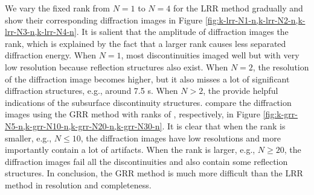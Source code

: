 We vary the fixed rank from $N=1$ to $N=4$ for the LRR method gradually and show their corresponding diffraction images in Figure \ref{fig:k-lrr-N1-n,k-lrr-N2-n,k-lrr-N3-n,k-lrr-N4-n}. It is salient that the amplitude of diffraction images  the rank, which is explained by the fact that a larger rank causes less separated diffraction energy. When $N=1$, most discontinuities  imaged well but with very low resolution because  reflection structures also exist. When $N=2$, the resolution of the diffraction image becomes higher, but it also misses a lot of significant diffraction structures, e.g., around 7.5 s. When $N>2$, the  provide helpful indications of the subsurface discontinuity structures.  compare the diffraction images using the GRR method with ranks of , respectively, in Figure \ref{fig:k-grr-N5-n,k-grr-N10-n,k-grr-N20-n,k-grr-N30-n}. It is clear that when the rank is smaller, e.g., $N\le 10$, the diffraction images have low resolutions and more importantly contain a lot of artifacts. When the rank is larger, e.g., $N\ge 20$, the diffraction images fail  all the discontinuities and also contain some reflection structures. In conclusion, the GRR method is much more difficult than the LRR method in  resolution and completeness. 

